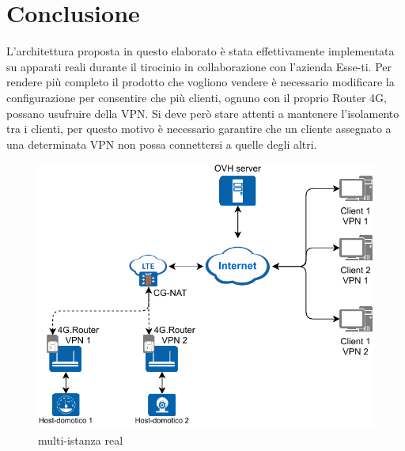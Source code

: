 \chapter{Conclusione \workinprogress}

L'architettura proposta in questo elaborato è stata effettivamente implementata su apparati reali durante il tirocinio in collaborazione con l'azienda Esse-ti. Per rendere più completo il prodotto che vogliono vendere è necessario modificare la configurazione per consentire che più clienti, ognuno con il proprio Router 4G, possano usufruire della VPN. Si deve però stare attenti a mantenere l'isolamento tra i clienti, per questo motivo è necessario garantire che un cliente assegnato a una determinata VPN non possa connettersi a quelle degli altri.

\begin{figure}
    \centering
    \includegraphics[width=0.8\linewidth]{immagini/diag2-multiistanza_real}
    \caption{multi-istanza real}
    \label{fig:diag2-multiistanza_real}
\end{figure}

